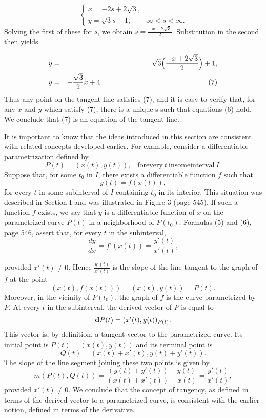 \begin{example}
\begin{equation}
\left \{ \begin{array}{l}
x = - 2s + 2 \sqrt 3 ,\\
y= \sqrt {3} s + 1, \;\;\; -\infty < s < \infty .
\end{array}
\right .
\label{eq10.4.6}
\end{equation}
Solving the first of these for $s$, we obtain $s = \frac{-x + 2\sqrt 3}{2}$. Substitution in the second then yields


\begin{eqnarray*}
y &=& \sqrt 3 \Big(\frac{-x + 2\sqrt 3}{2} \Big) + 1,\\
y &=& - \frac{\sqrt 3}{2}x + 4.  \mbox{\hspace{2in} (7)}
\end{eqnarray*}
Thus any point on the tangent line satisfies (7), and it is easy to verify that, for any $x$ and $y$ which satisfy (7), there is a unique s such that equations (6) hold. We conclude that (7) is an equation of the tangent line.
\end{example}

It is important to know that the ideas introduced in this section are consistent with related concepts developed earlier. For example, consider a differentiable parametrization defined by
$$
P(t) = (x(t), y(t)), \;\;\;\mathrm{for every}~t~\mathrm{in some interval}~I. 
$$
Suppose that, for some $t_0$ in $I$, there exists a differentiable function $f$ such that 
$$
y(t) = f(x(t)),
$$
for every $t$ in some subinterval of $I$ containing $t_0$ in its interior. This situation was described in Section I and was illustrated in Figure 3 (page 545). If such a function $f$ exists, we say that $y$ is a differentiable function of $x$ on the parametrized curve $P(t)$ in a neighborhood of $P(t_0)$. Formulas (5) and (6), page 546, assert that, for every $t$ in the subinterval, 
$$
\frac{dy}{dx} = f'(x(t)) = \frac{y'(t)}{x'(t)},
$$

\noindent provided $x'(t) \neq 0$. Hence $\frac{y'(t)}{x'(t)}$ is the slope of the line tangent to the graph of $f$ at the point   
$$
(x(t), f(x(t))) = (x(t), y(t)) = P(t) .
$$
Moreover, in the vicinity of $P(t_0)$, the graph of $f$ is the curve parametrized by $P$. At every $t$ in the subinterval, the derived vector of $P$ is equal to
$$
\mbox{\bf{d}}P(t) = (x'(t), y (t))_{P(t)} .
$$
This vector is, by definition, a tangent vector to the parametrized curve. Its initial point is $P(t) = (x(t), y(t))$ and its terminal point is
$$
Q(t) = (x(t) + x'(t), y(t) + y'(t)).
$$
The slope of the line segment joining these two points is given by 
$$
m(P(t), Q(t)) = \frac{(y(t) + y'(t)) - y(t)}{(x(t) + x'(t)) - x(t)} = \frac{y'(t)}{x'(t)},
$$
provided $x'(t) \neq 0$. We conclude that the concept of tangency, as defined in terms of the derived vector to a parametrized curve, is consistent with the earlier notion, defined in terms of the derivative.
 
